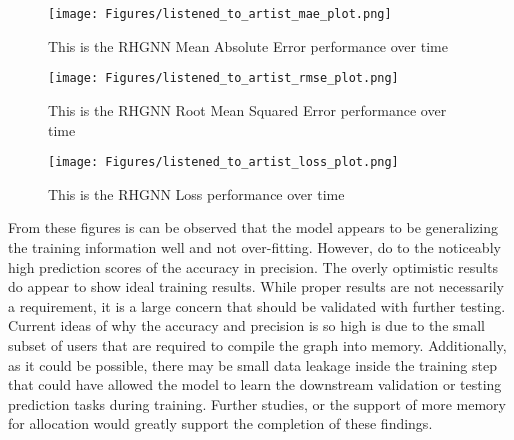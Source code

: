 \begin{figure}[!ht]
    \texttt{[image: Figures/listened\_to\_artist\_mae\_plot.png]}%
\caption{This is the RHGNN Mean Absolute Error performance over time}
\label{fig:timeseries}
\end{figure}

\begin{figure}[!ht]
    \texttt{[image: Figures/listened\_to\_artist\_rmse\_plot.png]}%
\caption{This is the RHGNN Root Mean Squared Error performance over time}
\label{fig:timeseries}
\end{figure}

\begin{figure}[!ht]
    \texttt{[image: Figures/listened\_to\_artist\_loss\_plot.png]}%
\caption{This is the RHGNN Loss performance over time}
\label{fig:timeseries}
\end{figure}

From these figures is can be observed that the model appears to be generalizing the training information well and not over-fitting. However, do to the noticeably high prediction scores of the accuracy in precision. The overly optimistic results do appear to show ideal training results. While proper results are not necessarily a requirement, it is a large concern that should be validated with further testing. Current ideas of why the accuracy and precision is so high is due to the small subset of users that are required to compile the graph into memory. Additionally, as it could be possible, there may be small data leakage inside the training step that could have allowed the model to learn the downstream validation or testing prediction tasks during training. Further studies, or the support of more memory for allocation would greatly support the completion of these findings.